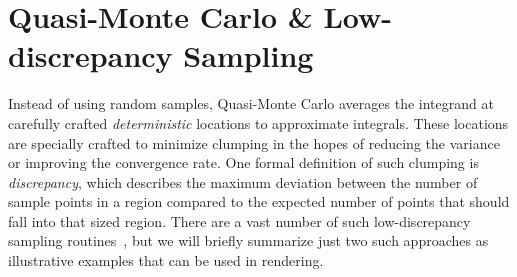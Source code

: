 \documentclass[11pt,fleqn]{book} %
\begin{document}
\section{Quasi-Monte Carlo \& Low-discrepancy Sampling}
Instead of using random samples, Quasi-Monte Carlo averages the integrand at carefully crafted \textit{deterministic} locations to approximate integrals. These locations are specially crafted to minimize clumping in the hopes of reducing the variance or improving the convergence rate. One formal definition of such clumping is \textit{discrepancy}, which describes the maximum deviation between the number of sample points in a region compared to the expected number of points that should fall into that sized region. There are a vast number of such low-discrepancy sampling routines~\cite{niederreiter1992quasi}, but we will briefly summarize just two such approaches as illustrative examples that can be used in rendering.
%
\end{document}
